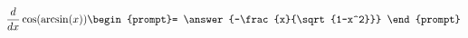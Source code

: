 \documentclass{ximera}
\author{Steven Gubkin\and Nela Lakos}
\begin{document}
\begin{exercise}

\[
\frac{d}{dx} \cos(\arcsin(x)) \begin{prompt}= \answer{-\frac{x}{\sqrt{1-x^2}}}
\end{prompt}
\]



\end{exercise}
\end{document}
